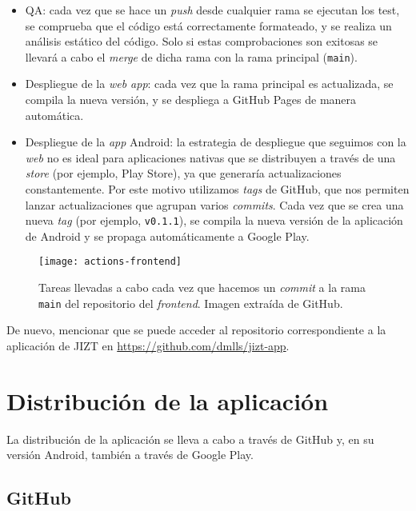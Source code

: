 \vspace{-0.3cm}
\begin{itemize} [\textbullet]
	\item QA: cada vez que se hace un \emph{push} desde cualquier rama se ejecutan los test, se comprueba que el código está correctamente formateado, y se realiza un análisis estático del código. Solo si estas comprobaciones son exitosas se llevará a cabo el \emph{merge} de dicha rama con la rama principal (\texttt{main}).
	
	\item Despliegue de la \emph{web app}: cada vez que la rama principal es actualizada, se compila la nueva versión, y se despliega a GitHub Pages de manera automática.
	
	\item Despliegue de la \emph{app} Android: la estrategia de despliegue que seguimos con la \emph{web} no es ideal para aplicaciones nativas que se distribuyen a través de una \emph{store} (por ejemplo, Play Store), ya que generaría actualizaciones constantemente. Por este motivo utilizamos \emph{tags} de GitHub, que nos permiten lanzar actualizaciones que agrupan varios \emph{commits}. Cada vez que se crea una nueva \emph{tag} (por ejemplo, \texttt{v0.1.1}), se compila la nueva versión de la aplicación de Android y se propaga automáticamente a Google Play.
\end{itemize}

\begin{figure}[h!]
	\centering
	\texttt{[image: actions-frontend]}
	\caption[GitHub Actions en el \emph{frontend}.]{Tareas llevadas a cabo cada vez que hacemos un \emph{commit} a la rama \texttt{main} del repositorio del \emph{frontend}. Imagen extraída de GitHub.}
\end{figure}

De nuevo, mencionar que se puede acceder al repositorio correspondiente a la aplicación de JIZT en \href{https://github.com/dmlls/jizt-app}{https://github.com/dmlls/jizt-app}.

\bigskip

\section{Distribución de la aplicación}

La distribución de la aplicación se lleva a cabo a través de GitHub y, en su versión Android, también a través de Google Play.

\subsection{GitHub}

